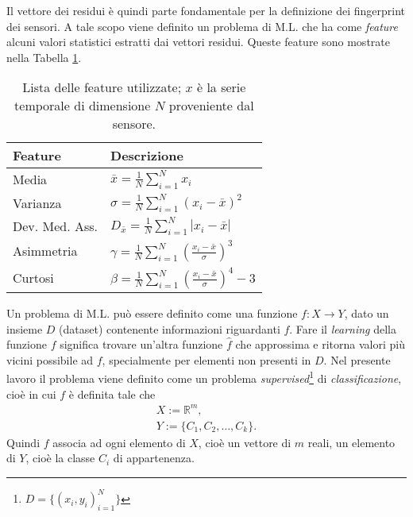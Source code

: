 \documentclass[Lau,binding=0.6cm]{sapthesis}
\begin{document}
Il vettore dei residui \`e quindi parte fondamentale per la definizione dei fingerprint dei sensori.
A tale scopo viene definito un problema di M.L. che ha come \textit{feature} alcuni valori statistici estratti dai vettori residui.
Queste feature sono mostrate nella Tabella \ref{tab:1}.

\begin{table}[tb]
    \begin{center}
    \begin{tabular}{|l|l|}
    \hline
    Feature & Descrizione \\
    \hline
    Media & $\bar{x} = \frac{1}{N}\sum_{i=1}^N x_i$ \\
    \hline
    Varianza & $\sigma = \frac{1}{N}\sum_{i=1}^N (x_i - \bar{x})^2 $ \\
    \hline
    Dev. Med. Ass. & $D_{\bar{x}} = \frac{1}{N}\sum_{i=1}^N |x_i - \bar{x}|$ \\
    \hline
    Asimmetria & $\gamma = \frac{1}{N} \sum_{i=1}^N (\frac{x_i - \bar{x}}{\sigma})^3 $ \\
    \hline
    Curtosi & $ \beta = \frac{1}{N} \sum_{i=1}^N (\frac{x_i - \bar{x}}{\sigma})^4 - 3$\\
    \hline
    \end{tabular}
    \end{center}
    \caption{Lista delle feature utilizzate; $x$ \`e la serie temporale di dimensione $N$ proveniente dal sensore.}
    \label{tab:1}
\end{table}

Un problema di M.L. pu\`o essere definito come una funzione $f: X \to Y$, dato un insieme $D$ (dataset) contenente informazioni riguardanti $f$.
Fare il \textit{learning} della funzione $f$ significa trovare un'altra funzione $\hat{f}$ che approssima e ritorna valori più vicini possibile ad $f$, specialmente per elementi non presenti in $D$.
Nel presente lavoro il problema viene definito come un problema \textit{supervised}\footnote{$D = \{ (x_i, y_i)_{i=1}^N \}$} di \textit{classificazione}, cio\`e in cui $f$ \`e definita tale che
\begin{equation}
    \begin{array}{l}
    X := \mathbb{R}^m, \\
    Y := \{ C_1, C_2, \ldots, C_k \}.
    \end{array}
\end{equation}
Quindi $f$ associa ad ogni elemento di $X$, cio\`e un vettore di $m$ reali, un elemento di $Y$, cio\`e la classe $C_i$ di appartenenza.
\end{document}
